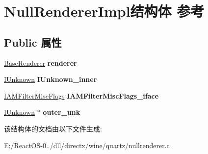 \hypertarget{struct_null_renderer_impl}{}\section{Null\+Renderer\+Impl结构体 参考}
\label{struct_null_renderer_impl}
\subsection*{Public 属性}
\begin{DoxyCompactItemize}
\item 
\mbox{\label{struct_null_renderer_impl_aa14014fa3f7a7e22c56a7c7714a76533}} 
\hyperlink{struct_base_renderer_tag}{Base\+Renderer} {\bfseries renderer}
\item 
\mbox{\label{struct_null_renderer_impl_aa940d1cbb541f5768a9afaa280541831}} 
\hyperlink{interface_i_unknown}{I\+Unknown} {\bfseries I\+Unknown\+\_\+inner}
\item 
\mbox{\label{struct_null_renderer_impl_a5b99b5c6d90b5b43fdf1b6ec47c1fcea}} 
\hyperlink{interface_i_a_m_filter_misc_flags}{I\+A\+M\+Filter\+Misc\+Flags} {\bfseries I\+A\+M\+Filter\+Misc\+Flags\+\_\+iface}
\item 
\mbox{\label{struct_null_renderer_impl_aa037539f0fe8225c688c738eeba58113}} 
\hyperlink{interface_i_unknown}{I\+Unknown} $\ast$ {\bfseries outer\+\_\+unk}
\end{DoxyCompactItemize}


该结构体的文档由以下文件生成\+:\begin{DoxyCompactItemize}
\item 
E\+:/\+React\+O\+S-\/0../dll/directx/wine/quartz/nullrenderer.\+c\end{DoxyCompactItemize}
